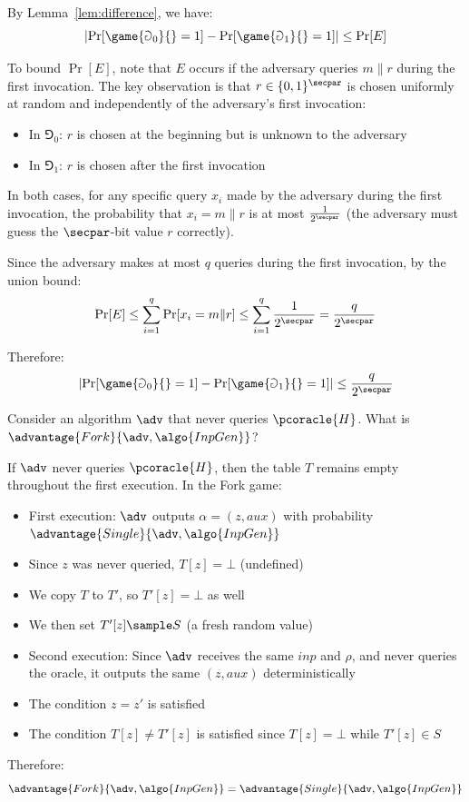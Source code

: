 \begin{mysolution}
  By Lemma~\ref{lem:difference}, we have:
  \[
  \left|\Pr[\game{\Game_0}{} = 1] - \Pr[\game{\Game_1}{} = 1]\right| \leq \Pr[E]
  \]
  
  To bound $\Pr[E]$, note that $E$ occurs if the adversary queries $m \| r$ during the first invocation. The key observation is that $r \in \{0,1\}^\secpar$ is chosen uniformly at random and independently of the adversary's first invocation:
  \begin{itemize}
    \item In $\Game_0$: $r$ is chosen at the beginning but is unknown to the adversary
    \item In $\Game_1$: $r$ is chosen after the first invocation
  \end{itemize}
  
  In both cases, for any specific query $x_i$ made by the adversary during the first invocation, the probability that $x_i = m \| r$ is at most $\frac{1}{2^\secpar}$ (the adversary must guess the $\secpar$-bit value $r$ correctly).
  
  Since the adversary makes at most $q$ queries during the first invocation, by the union bound:
  \[
  \Pr[E] \leq \sum_{i=1}^q \Pr[x_i = m \| r] \leq \sum_{i=1}^q \frac{1}{2^\secpar} = \frac{q}{2^\secpar}
  \]
  
  Therefore:
  \[
  \left|\Pr[\game{\Game_0}{} = 1] - \Pr[\game{\Game_1}{} = 1]\right| \leq \frac{q}{2^\secpar}
  \]
\end{mysolution}
\fi

\begin{exercise}
  Consider an algorithm $\adv$ that never queries $\pcoracle{H}$. What is $\advantage{Fork}{\adv, \algo{InpGen}}$?
\end{exercise}

\ifsolutions
\begin{mysolution}
  If $\adv$ never queries $\pcoracle{H}$, then the table $T$ remains empty throughout the first execution. In the Fork game:
  
  \begin{itemize}
    \item First execution: $\adv$ outputs $\alpha = (z, \mathit{aux})$ with probability $\advantage{Single}{\adv, \algo{InpGen}}$
    \item Since $z$ was never queried, $T[z] = \bot$ (undefined)
    \item We copy $T$ to $T'$, so $T'[z] = \bot$ as well
    \item We then set $T'[z] \sample S$ (a fresh random value)
    \item Second execution: Since $\adv$ receives the same $\mathit{inp}$ and $\rho$, and never queries the oracle, it outputs the same $(z, \mathit{aux})$ deterministically
    \item The condition $z = z'$ is satisfied
    \item The condition $T[z] \neq T'[z]$ is satisfied since $T[z] = \bot$ while $T'[z] \in S$
  \end{itemize}
  
  Therefore:
  \[
  \advantage{Fork}{\adv, \algo{InpGen}} = \advantage{Single}{\adv, \algo{InpGen}}
  \]
\end{mysolution}
\fi

